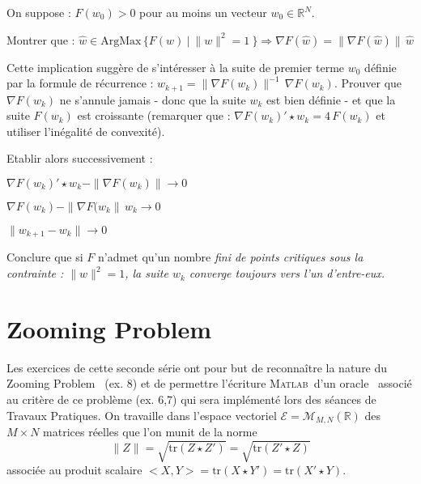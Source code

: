 \documentclass[12pt,a4paper,fleqn]{report}
\newcommand{\matlab}{\textsc{Matlab}}
\newcommand{\R}{\mathbb R}
\newcommand{\grad}{\nabla}
\newcommand{\on}{\begin{displaymath}}
\newcommand{\off}{\end{displaymath}}
\begin{document}
\begin{exercice}
On suppose : $F(w_0)>0$ pour au moins un vecteur $w_0\in\R^N$.
\begin{questions}
\item  Montrer que : \mbox{$\hat w \in \mathrm{ArgMax}\,\{ F(w)\ | \ \|w\|^2=1\ \} \Rightarrow \grad F(\hat w) = \| \grad F(\hat w) \|\,\hat w$}
\item Cette implication suggère de s'intéresser à la suite de premier terme $w_0$ définie par la formule de récurrence :
\mbox{$ w_{k+1}= \| \grad F(w_k) \| ^{-1}  \, \grad F(w_k)$}. Prouver que
 $\grad F(w_k)$ ne s'annule jamais - donc que la suite $w_k$ est bien définie - et que la suite $F(w_k)$ est croissante (remarquer que : $\grad F(w_k)'\star w_k= 4\,F(w_k)$ et utiliser l'inégalité de convexité).
\item Etablir alors successivement :
\begin{subquestions}
\item $\grad F(w_k)'\star w_k-\| \grad F(w_k)\| \rightarrow 0$
\item $\grad F(w_k)-\|\grad F(w_k\|\,w_k \rightarrow 0$
\item $\|w_{k+1}-w_k\|\rightarrow 0$
\end{subquestions}
\item Conclure que si $F$ n'admet qu'un nombre \it fini \rm de points critiques sous la contrainte : $\|w\|^2=1$, la suite $w_k$ converge toujours vers l'un d'entre-eux.
\end{questions}

\end{exercice}



\section{Zooming Problem}

Les exercices de cette seconde s\'erie ont pour but de reconnaître la nature du \og Zooming Problem \fg\ (ex. 8) et de permettre l'\'ecriture \matlab\ d'un \og oracle \fg\ associ\'e au crit\`ere de ce probl\`eme (ex. 6,7) qui sera impl\'ement\'e lors des s\'eances de Travaux Pratiques. On travaille dans l'espace vectoriel $\mathcal E=\mathcal M_{M,N}(\R)$ des $M\times N$ matrices r\'eelles que l'on munit de la norme
\on \|Z\|=\sqrt{\mathrm{tr}(Z\star Z')}=\sqrt{\mathrm{tr}(Z'\star Z)}\off
associ\'ee au produit scalaire $<X,Y>=\mathrm{tr}(X\star Y')=\mathrm{tr}(X'\star Y)$.
\end{document}
